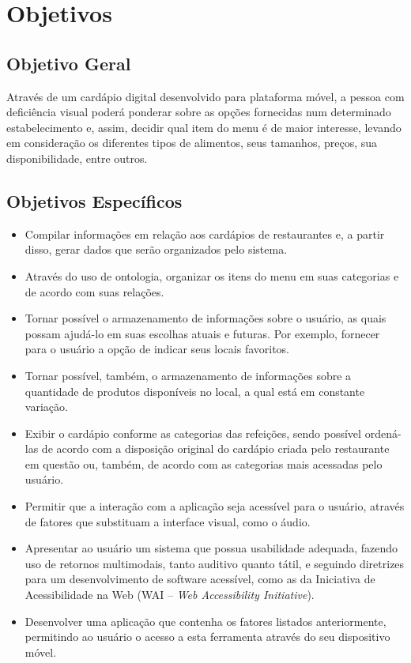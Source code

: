 \chapter{\label{chap:objet}Objetivos}

\section{Objetivo Geral}
Através de um cardápio digital desenvolvido para plataforma móvel, a pessoa com deficiência visual poderá ponderar sobre as opções fornecidas num determinado estabelecimento e, assim, decidir qual item do menu é de maior interesse, levando em consideração os diferentes tipos de alimentos, seus tamanhos, preços, sua disponibilidade, entre outros. 

\section{Objetivos Específicos}
\begin{itemize}
    \item Compilar informações em relação aos cardápios de restaurantes e, a partir disso, gerar dados que serão organizados pelo sistema.
    \item Através do uso de ontologia, organizar os itens do menu em suas categorias e de acordo com suas relações.
    \item Tornar possível o armazenamento de informações sobre o usuário, as quais possam ajudá-lo em suas escolhas atuais e futuras. Por exemplo, fornecer para o usuário a opção de indicar seus locais favoritos.
    \item Tornar possível, também, o armazenamento de informações sobre a quantidade de produtos disponíveis no local, a qual está em constante variação.
    \item Exibir o cardápio conforme as categorias das refeições, sendo possível ordená-las de acordo com a disposição original do cardápio criada pelo restaurante em questão ou, também, de acordo com as categorias mais acessadas pelo usuário.
    \item Permitir que a interação com a aplicação seja acessível para o usuário, através de fatores que substituam a interface visual, como o áudio.
    \item Apresentar ao usuário um sistema que possua usabilidade adequada, fazendo uso de retornos multimodais, tanto auditivo quanto tátil, e seguindo diretrizes para um desenvolvimento de software acessível, como as da Iniciativa de Acessibilidade na Web (WAI -- \emph{Web Accessibility Initiative}).
    \item Desenvolver uma aplicação que contenha os fatores listados anteriormente, permitindo ao usuário o acesso a esta ferramenta através do seu dispositivo móvel.
\end{itemize}